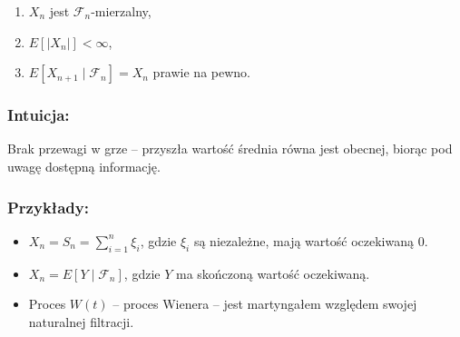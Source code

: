 \begin{enumerate}
    \item $X_n$ jest $\mathcal{F}_n$-mierzalny,
    \item $E[|X_n|] < \infty$,
    \item $E[X_{n+1} \mid \mathcal{F}_n] = X_n$ prawie na pewno.
\end{enumerate}

\subsubsection*{Intuicja:}
Brak przewagi w grze -- przyszła wartość średnia równa jest obecnej, biorąc pod uwagę dostępną informację.

\subsubsection*{Przykłady:}

\begin{itemize}
    \item $X_n = S_n = \sum_{i=1}^n \xi_i$, gdzie $\xi_i$ są niezależne, mają wartość oczekiwaną 0.
    \item $X_n = E[Y \mid \mathcal{F}_n]$, gdzie $Y$ ma skończoną wartość oczekiwaną.
    \item Proces $W(t)$ -- proces Wienera -- jest martyngałem względem swojej naturalnej filtracji.
\end{itemize}
